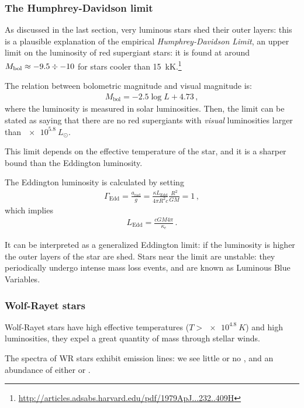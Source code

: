 \documentclass[main.tex]{subfiles}
\begin{document}
\subsubsection{The Humphrey-Davidson limit}

As discussed in the last section, very luminous stars shed their outer layers: this is a plausible explanation of the empirical \emph{Humphrey-Davidson Limit}, an upper limit on the luminosity of red supergiant stars: it is found at around \(M _{\text{bol}} \approx -9.5 \divisionsymbol -10 \) for stars cooler than \SI{15}{kK}.\footnote{\url{http://articles.adsabs.harvard.edu/pdf/1979ApJ...232..409H}}

The relation between bolometric magnitude and visual magnitude is: 
%
\begin{align}
  M _{\text{bol}} = -2.5 \log L + 4.73
\,,
\end{align}
%
where the luminosity is measured in solar luminosities. 
Then, the limit can be stated as saying that there are no red supergiants with \emph{visual} luminosities larger than \(\SI{e5.8}{}L_{\odot}\).

This limit depends on the effective temperature of the star, and it is a sharper bound than the Eddington luminosity.

The Eddington luminosity is calculated by setting
%
\begin{align}
  \Gamma_{\text{Edd}} = \frac{a _{\text{rad}}}{g} = \frac{\kappa L _{\text{Edd}}}{4 \pi R^2 c} \frac{R^2}{GM} =1
\,,
\end{align}
%
which implies 
%
\begin{align}
  L _{\text{Edd}} = \frac{cGM 4 \pi }{\kappa_e}
\,.
\end{align}

It can be interpreted as a generalized Eddington limit: if the luminosity is higher the outer layers of the star are shed.
Stars near the limit are unstable: they periodically undergo intense mass loss events, and are known as Luminous Blue Variables.

\subsubsection{Wolf-Rayet stars}

Wolf-Rayet stars have high effective temperatures (\(T > \SI{e4.8}{K}\)) and high luminosities, they expel a great quantity of mass through stellar winds. 

The spectra of WR stars exhibit emission lines: we see little or no , and an abundance of either  or .
\end{document}
